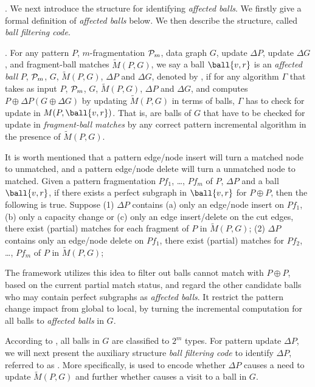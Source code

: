 .
We next introduce the structure for identifying {\em affected balls}. We firstly give a formal definition of {\em affected balls} below. We then describe the structure, called {\em ball filtering code}.

.
For any pattern $P$, $m$-fragmentation ${\cal P}_{m}$, data graph $G$, update $\Delta P$, update $\Delta G$, and fragment-ball matches $\tilde{M}(P,G)$,
we say a ball $\ball{v,r}$ is an {\em affected ball} \wrt $P$, ${\cal P}_{m}$, $G$, $\tilde{M}(P,G)$, $\Delta P$ and $\Delta G$, denoted by \affballx, if for any algorithm $\Gamma$
that takes as input $P$, ${\cal P}_{m}$, $G$, $\tilde{M}(P,G)$, $\Delta P$ and $\Delta G$,
and computes $P\oplus\Delta P(G\oplus\Delta G)$ by updating $\tilde{M}(P,G)$ in terms of balls, $\Gamma$ has to check for update in $M(P,\ball{v,r})$.
That is, \affballsx are balls of $G$ that have to be checked for update in {\em fragment-ball matches} by any correct pattern incremental algorithm in the presence of $\tilde{M}(P,G)$.


It is worth mentioned that a pattern edge/node insert will turn a matched node to unmatched, and a pattern edge/node delete will turn a unmatched node to matched.
Given a pattern fragmentation $Pf_{1}$, \ldots, $Pf_{m}$ of $P$, $\Delta P$ and a ball $\ball{v,r}$, if there exists a perfect subgraph in $\ball{v,r}$ for $P \oplus P$, then the following is true.
Suppose (1) $\Delta P$ contains (a) only an edge/node insert on $Pf_{1}$, (b) only a capacity change or (c) only an edge insert/delete on the cut edges, there exist (partial) matches for each fragment of $P$ in $\tilde{M}(P,G)$;
(2) $\Delta P$ contains only an edge/node delete on $Pf_{1}$, there exist (partial) matches for $Pf_{2}$, \ldots, $Pf_{m}$ of $P$ in $\tilde{M}(P,G)$;

The framework utilizes this idea to filter out balls cannot match with $P \oplus P$, based on the current partial match status, and regard the other candidate balls who may contain perfect subgraphs as {\em affected balls}. It restrict the pattern change impact from global to local, by turning the incremental computation for all balls to {\em affected balls} in $G$.


According to \fbmatstruct, all balls in $G$ are classified to $2^m$ types. For pattern update $\Delta P$, we will next present the auxiliary structure {\em ball filtering code} to identify \affballsx \wrt $\Delta P$, referred to as \ballfilter.
More specifically,  \ballfilter is used to encode whether $\Delta P$ causes a need to update $\tilde{M}(P,G)$ and further whether causes a visit to a ball in $G$.

